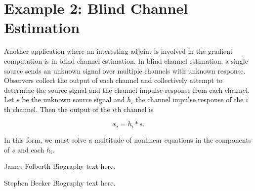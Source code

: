 \documentclass[journal]{IEEEtran}
\begin{document}


\section{Example 2: Blind Channel Estimation}
Another application where an interesting adjoint is involved in the gradient computation is in blind channel estimation.  In blind channel estimation, a single source sends an unknown signal over multiple channels with unknown response.  Observers collect the output of each channel and collectively attempt to determine the source signal and the channel impulse response from each channel.  Let $s$ be the unknown source signal and $h_i$ the channel impulse response of the $i$th channel.  Then the output of the $i$th channel is

\[ x_i = h_i\ast s. \] 

\noindent In this form, we must solve a multitude of nonlinear equations in the components of $s$ and each $h_i$.  






\begin{IEEEbiographynophoto}{James Folberth}
Biography text here.
\end{IEEEbiographynophoto}

\begin{IEEEbiographynophoto}{Stephen Becker}
Biography text here.
\end{IEEEbiographynophoto}
\end{document}

